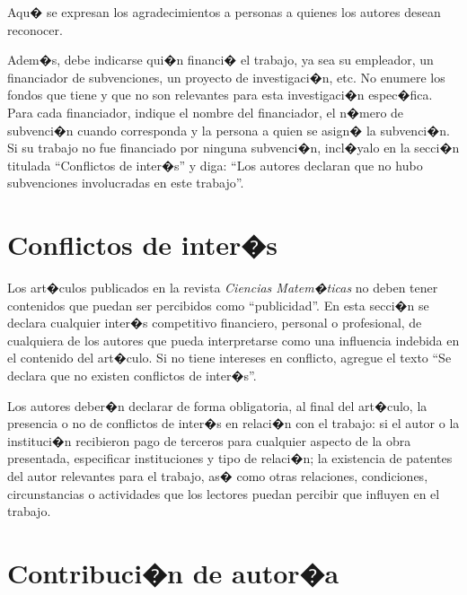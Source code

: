 \documentclass[10pt,twoside]{rcmart} %
\begin{document}
	Aqu� se expresan los agradecimientos a personas a quienes los autores desean reconocer. 
	
	Adem�s, debe indicarse qui�n financi� el trabajo, ya sea su empleador, un financiador de subvenciones, un proyecto de investigaci�n, etc. No enumere los fondos que tiene y que no son relevantes para esta investigaci�n espec�fica. Para cada financiador, indique el nombre del financiador, el n�mero de subvenci�n cuando corresponda y la persona a quien se asign� la subvenci�n. Si su trabajo no fue financiado por ninguna subvenci�n, incl�yalo en la secci�n titulada ``Conflictos de inter�s'' y diga: ``Los autores declaran que no hubo subvenciones involucradas en este trabajo''.

\section*{Conflictos de inter�s}

	Los art�culos publicados en la revista \textit{Ciencias Matem�ticas} no deben tener contenidos que puedan ser percibidos como ``publicidad''. En esta secci�n se declara cualquier inter�s competitivo financiero, personal o profesional, de cualquiera de los autores que pueda interpretarse como una influencia indebida en el contenido del art�culo. Si no tiene intereses en conflicto, agregue el texto ``Se declara que no existen conflictos de inter�s''.

	Los autores deber�n declarar de forma obligatoria, al final del art�culo, la presencia o no de conflictos de inter�s en relaci�n con el trabajo: si el autor o la instituci�n recibieron pago de terceros para cualquier aspecto de la obra presentada, especificar instituciones y tipo de relaci�n; la existencia de patentes del autor relevantes para el trabajo, as� como otras relaciones, condiciones, circunstancias o actividades que los lectores puedan percibir que influyen en el trabajo.

\section*{Contribuci�n de autor�a}
\end{document}

